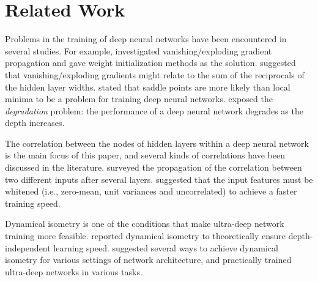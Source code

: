 \chapter{Related Work}
\label{related}

Problems in the training of deep neural networks have been encountered in several studies.
For example, \cite{xavier, he} investigated vanishing/exploding gradient propagation and gave weight initialization methods as the solution. \cite{evop} suggested that vanishing/exploding gradients might relate to the sum of the reciprocals of the hidden layer widths.
\cite{opt_prob, saddle} stated that saddle points are more likely than local minima to be a problem for training deep neural networks.
\cite{degrade1, degrade2, resnet1} exposed the \textit{degradation} problem: the performance of a deep neural network degrades as the depth increases.

The correlation between the nodes of hidden layers within a deep neural network is the main focus of this paper, and several kinds of correlations have been discussed in the literature.
\cite{mft:info} surveyed the propagation of the correlation between two different inputs after several layers.
\cite{whiten1, whiten2} suggested that the input features must be whitened (i.e., zero-mean, unit variances and uncorrelated) to achieve a faster training speed.

Dynamical isometry is one of the conditions that make ultra-deep network training more feasible.
\cite{mft:linear} reported dynamical isometry to theoretically ensure depth-independent learning speed.
\cite{mft:sigmoid, mft:spectral} suggested several ways to achieve dynamical isometry for various settings of network architecture, and \cite{mft:cnn, mft:rnn} practically trained ultra-deep networks in various tasks.
